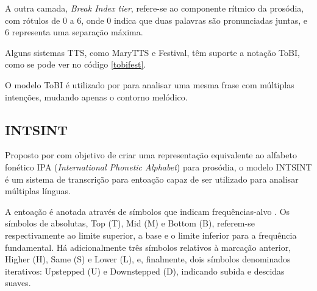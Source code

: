 A outra camada, \emph{Break Index tier}, refere-se ao componente rítmico da
prosódia, com rótulos de 0 a 6, onde 0 indica que duas palavras são
pronunciadas juntas, e 6 representa uma separação máxima.

Alguns sistemas TTS, como MaryTTS e Festival, têm suporte a notação ToBI, como se
pode ver no código \ref{tobifest}.

O modelo ToBI é utilizado por  para analisar uma mesma
frase com múltiplas intenções, mudando apenas o contorno melódico.



\subsection{INTSINT}
\label{intsintsec}
Proposto por  com objetivo de criar uma representação
equivalente ao alfabeto fonético IPA (\emph{International Phonetic Alphabet})
para prosódia, o modelo INTSINT é um sistema de transcrição para entoação capaz
de ser utilizado para analisar múltiplas línguas.

A entoação é anotada através de símbolos que indicam frequências-alvo
. Os símbolos de absolutas, Top (T), Mid (M) e Bottom (B), referem-se
respectivamente ao limite superior, a base e o limite inferior para a frequência
fundamental. Há adicionalmente três símbolos relativos à marcação anterior,
Higher (H), Same (S) e Lower (L), e, finalmente, dois símbolos denominados
iterativos: Upstepped (U) e Downstepped (D), indicando subida e descidas suaves.

